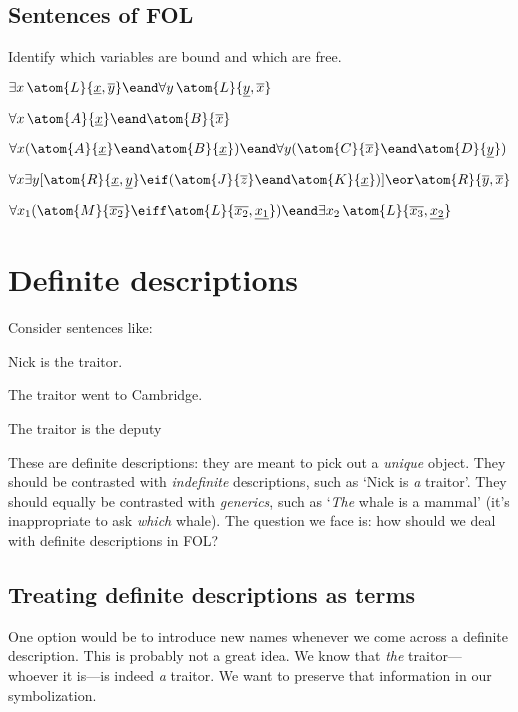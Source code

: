 \begin{practiceproblems}
\chapter{Sentences of FOL}\setcounter{ProbPart}{0}
\problempart
\label{pr.freeFOL}
Identify which variables are bound and which are free.
\begin{earg}
\item $\exists x\, \atom{L}{\underline{x},\overline{y}} \eand \forall y\,\atom{L}{\underline{y},\overline{x}}$
\item $\forall x\, \atom{A}{\underline{x}} \eand \atom{B}{\overline{x}}$
\item $\forall x (\atom{A}{\underline{x}} \eand \atom{B}{\underline{x}}) \eand \forall y(\atom{C}{\overline{x}} \eand \atom{D}{\underline{y}})$
\item $\forall x\exists y[\atom{R}{\underline{x},\underline{y}} \eif (\atom{J}{\overline{z}} \eand \atom{K}{\underline{x}})] \eor \atom{R}{\overline{y},\overline{x}}$
\item $\forall x_1(\atom{M}{\overline{x_2}} \eiff \atom{L}{\overline{x_2},\underline{x_1}}) \eand \exists x_2\, \atom{L}{\overline{x_3},\underline{x_2}}$
\end{earg}


\end{practiceproblems}


\chapter{Definite descriptions}\label{subsec.defdesc}
Consider sentences like:
	\begin{earg}
		\item[\ex{traitor1}] Nick is the traitor.
		\item[\ex{traitor2}] The traitor went to Cambridge.
		\item[\ex{traitor3}] The traitor is the deputy
	\end{earg}
These are definite descriptions: they are meant to pick out a \emph{unique} object. They should be contrasted with \emph{indefinite} descriptions, such as `Nick  is \emph{a} traitor'. They should equally be contrasted with \emph{generics}, such as `\emph{The} whale is a mammal' (it's inappropriate to ask \emph{which} whale). The question we face is: how should we deal with definite descriptions in FOL?


\section{Treating definite descriptions as terms}
One option would be to introduce new names whenever we come across a definite description. This is probably not a great idea. We know that \emph{the} traitor---whoever it is---is indeed \emph{a} traitor. We want to preserve that information in our symbolization.

